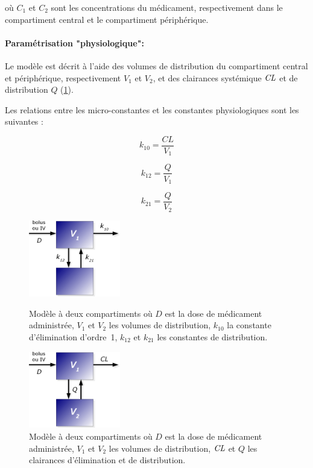 où $C_1$ et $C_2$ sont les concentrations du médicament, respectivement dans le compartiment central et le compartiment périphérique.

\paragraph*{Paramétrisation "physiologique":} Le modèle est décrit à l'aide des volumes de distribution du compartiment central et périphérique, respectivement $V_1$ et $V_2$, et des clairances systémique $\operatorname{\textit{CL}}$ et de distribution $Q$ (\ref{fig:5}). 

Les relations entre les micro-constantes et les constantes physiologiques sont les suivantes :

\begin{equation}
k_{10}  =  \frac{CL}{V_1}
\label{eq:25}
\end{equation}

\begin{equation}
k_{12}  =  \frac{Q}{V_1}
\label{eq:26}
\end{equation}

\begin{equation}
k_{21}  =  \frac{Q}{V_2}
\label{eq:27}
\end{equation}

\begin{figure}[h!]
        \centering \includegraphics[width=4cm]{figures/raster/FIG_4}
        \caption[Modèle à deux compartiments (micro constantes]{Modèle à deux compartiments où $D$ est la dose de médicament administrée, $V_1$ et $V_2$ les volumes de distribution, $k_{10}$ la constante d'élimination d'ordre~1, $k_{12}$ et $k_{21}$ les constantes de distribution.}
	\label{fig:4}
        \centering \includegraphics[width=4cm]{figures/raster/FIG_5}
        \caption[Modèle à deux compartiments (constantes "physiologiques")]{Modèle à deux compartiments où $D$ est la dose de médicament administrée, $V_1$ et $V_2$ les volumes de distribution, $\operatorname{\textit{CL}}$ et $Q$ les clairances d'élimination et de distribution.}
	\label{fig:5}
\end{figure}

